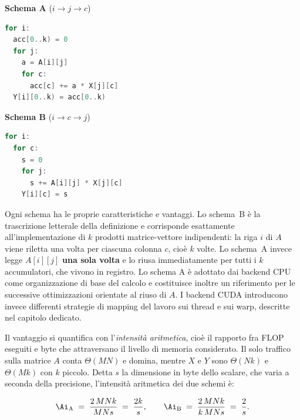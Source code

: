 \begin{center}

\begin{minipage}{0.46\linewidth}
\textbf{Schema A} ($i \to j \to c$)
\begin{lstlisting}[language=C]
for i:
  acc[0..k) = 0
  for j:
    a = A[i][j]
    for c:
      acc[c] += a * X[j][c]
  Y[i][0..k) = acc[0..k)
\end{lstlisting}
\end{minipage}



\begin{minipage}{0.46\linewidth}
\textbf{Schema B} ($i \to c \to j$)
\begin{lstlisting}[language=C]
for i:
  for c:
    s = 0
    for j:
      s += A[i][j] * X[j][c]
    Y[i][c] = s
\end{lstlisting}
\end{minipage}\hfill

\end{center}

Ogni schema ha le proprie caratteristiche e vantaggi.
Lo schema~B è la trascrizione letterale della definizione e corrisponde esattamente
all'implementazione di $k$ prodotti matrice-vettore indipendenti:
la riga $i$ di $A$ viene riletta una volta per ciascuna colonna $c$, cioè $k$ volte.
Lo schema~A invece legge $A[i][j]$ \textbf{una sola volta} e lo riusa immediatamente
per tutti i $k$ accumulatori, che vivono in registro.
Lo schema A è adottato dai backend CPU come organizzazione di base del calcolo e
costituisce inoltre un riferimento per le successive ottimizzazioni orientate al riuso di $A$.
I backend CUDA introducono invece differenti strategie di mapping del lavoro sui thread e sui warp,
descritte nel capitolo dedicato.

\medskip

Il vantaggio si quantifica con l'\emph{intensità aritmetica}, cioè il rapporto fra
FLOP eseguiti e byte che attraversano il livello di memoria considerato.
Il solo traffico sulla matrice $A$ conta $\Theta(MN)$ e domina, mentre $X$ e $Y$ sono
$\Theta(Nk)$ e $\Theta(Mk)$ con $k$ piccolo. Detta $s$ la dimensione in byte
dello scalare, che varia a seconda della precisione, l'intensità aritmetica dei due schemi è:

\begin{equation}
  \Ai_{\text{A}} \;=\; \frac{2\,M N k}{M N s} \;=\; \frac{2k}{s},
  \qquad
  \Ai_{\text{B}} \;=\; \frac{2\,M N k}{k\,M N s} \;=\; \frac{2}{s} .
  \label{eq:intensita}
\end{equation}

